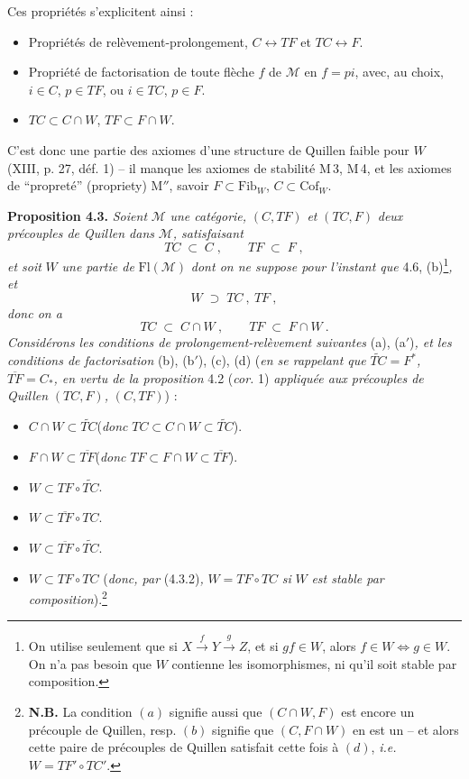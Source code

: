 \documentclass[11pt]{article}
\newcommand{\printedpage}[1]{\marginpar{\footnotesize p.~#1}}
\newcommand{\msp}[1]{\marginpar{\footnotesize [#1]}}
\newcommand{\Fl}{\mathrm{Fl}}
\begin{document}
\msp{page 32}
Ces propriétés s'explicitent ainsi :
\begin{itemize}[leftmargin=2.5em]
\item[\textbf{M\,1}] Propriétés de relèvement-prolongement, $C\longleftrightarrow TF$ et $TC\longleftrightarrow F$.
\item[\textbf{M\,2}] Propriété de factorisation de toute flèche $f$ de $\mathcal{M}$ en $f=pi$, avec, au choix, $i\in C$, $p\in TF$, ou $i\in TC$, $p\in F$.
\item[\textbf{M$'$}] $TC\subset C\cap W$, $TF\subset F\cap W$.
\end{itemize}

\printedpage{22}
C'est donc une partie des axiomes d'une structure de Quillen faible pour $W$ (XIII, p. 27, déf. 1) -- il manque les axiomes de stabilité M\,3, M\,4, et les axiomes de “propreté” (propriety) M$''$, savoir $F\subset\mathrm{Fib}_W$, $C\subset\mathrm{Cof}_W$.

\textbf{Proposition 4.3.} \textit{Soient} $\mathcal{M}$ \textit{une catégorie,} $(C,TF)$ \textit{et} $(TC,F)$ \textit{deux précouples de Quillen dans} $\mathcal{M}$\textit{, satisfaisant}
\[
TC \;\subset\; C\;, \qquad TF \;\subset\; F\;,
\tag*{(4.3.1)}
\]
\textit{et soit} $W$ \textit{une partie de} $\Fl(\mathcal{M})$ \textit{dont on ne suppose pour l'instant que} 4.6, (b)\footnote[10]{On utilise seulement que si $X\xrightarrow{\;f\;}Y\xrightarrow{\;g\;}Z$, et si $gf\in W$, alors $f\in W\Longleftrightarrow g\in W$. On n'a pas besoin que $W$ contienne les isomorphismes, ni qu'il soit stable par composition.}\textit{, et} %
\[
W \;\supset\; TC\ ,\ TF\ ,
\tag*{(4.3.2)}
\]
\textit{donc on a}
\[
TC \;\subset\; C\cap W\ , \qquad TF \;\subset\; F\cap W\ .
\tag*{(4.3.3)}
\]
\textit{Considérons les conditions de prolongement-relèvement suivantes} (a), (a$'$)\textit{, et les conditions de factorisation} (b), (b$'$), (c), (d) (\textit{en se rappelant que} $\widetilde{TC}=F^*$\textit{,} $\overline{TF}=C_*$\textit{, en vertu de la proposition} 4.2 (\textit{cor.} 1) \textit{appliquée aux précouples de Quillen} $(TC,F)$\textit{,} $(C,TF)$) :
\begin{itemize}[leftmargin=2.5em]
\item[a)] $C\cap W\subset\widetilde{TC}$\quad (\textit{donc} $TC\subset C\cap W\subset\widetilde{TC}$).
\item[a$'$)] $F\cap W\subset\overline{TF}$\quad (\textit{donc} $TF\subset F\cap W\subset\overline{TF}$).
\item[b)] $W\subset TF\circ\widetilde{TC}$.
\item[b$'$)] $W\subset\overline{TF}\circ TC$.
\item[c)] $W\subset\overline{TF}\circ\widetilde{TC}$.
\item[d)] $W\subset TF{\circ}TC$ (\textit{donc, par} (4.3.2)\textit{,} $W=TF{\circ}TC$ \textit{si} $W$ \textit{est stable par composition}).\footnote[11]{\textbf{N.B.} La condition $(a)$ signifie aussi que $(C\cap W,F)$ est encore un précouple de Quillen, resp. $(b)$ signifie que $(C,F\cap W)$ en est un -- et alors cette paire de précouples de Quillen satisfait cette fois à $(d)$, \textit{i.e.} $W=TF'\circ TC'$.} %
\end{itemize}
\end{document}
